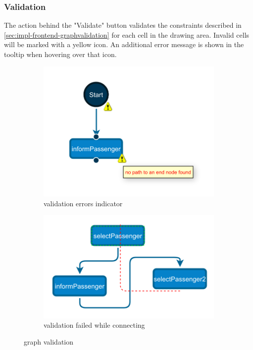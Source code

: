 \documentclass[a4paper,top=25mm,bottom=25mm,12pt,pdftex,halfparskip,twoside,bibtotoc,numbers=noenddot]{scrbook}
\begin{document}
\subsubsection{Validation}

The action behind the "Validate" button validates the constraints described in \ref{sec:impl-frontend-graphvalidation} for each cell in the drawing area. Invalid cells will be marked with a yellow icon. An additional error message is shown in the tooltip when hovering over that icon.

\begin{figure}
\centering
\begin{subfigure}{.4\textwidth}
  \centering
  \includegraphics[width=.8\linewidth]{validate1}
  \caption{validation errors indicator}
\end{subfigure}
\begin{subfigure}{.4\textwidth}
  \centering
  \includegraphics[width=.8\linewidth]{validate2}
  \caption{validation failed while connecting}
\end{subfigure}
\caption{graph validation}
\label{fig:cell-validation}
\end{figure}
\end{document}
